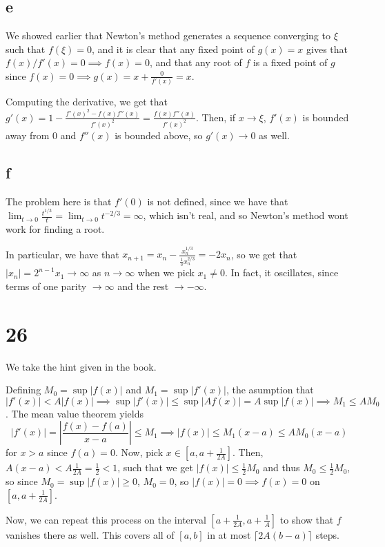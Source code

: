 \documentclass[12pt,letterpaper]{article}
\theoremstyle{definition}
\begin{document}
\subsection*{e}

We showed earlier that Newton's method generates a sequence converging to $\xi$ such that $f(\xi) = 0$, and it is clear that any fixed point of $g(x) = x$ gives that $f(x)/f'(x) = 0 \implies f(x) = 0$, and that any root of $f$ is a fixed point of $g$ since $f(x) = 0 \implies g(x) = x + \frac{0}{f'(x)} = x$.

Computing the derivative, we get that $g'(x) = 1 - \frac{f'(x)^{2} - f(x)f''(x)}{f'(x)^{2}} = \frac{f(x)f''(x)}{f'(x)^{2}}$. Then, if $x \rightarrow \xi$, $f'(x)$ is bounded away from 0 and $f''(x)$ is bounded above, so $g'(x) \rightarrow 0$ as well.

\subsection*{f}

The problem here is that $f'(0)$ is not defined, since we have that $\lim_{t \rightarrow 0}\frac{t^{1/3}}{t} = \lim_{t \rightarrow 0}t^{-2/3} = \infty$, which isn't real, and so Newton's method wont work for finding a root.

In particular, we have that $x_{n+1} = x_{n} - \frac{x_{n}^{1/3}}{\frac{1}{3}x_{n}^{2/3}} = -2x_{n}$, so we get that $|x_{n}| = 2^{n-1}x_{1} \rightarrow \infty$ as $n \rightarrow \infty$ when we pick $x_{1} \neq 0$. In fact, it oscillates, since terms of one parity $\rightarrow \infty$ and the rest $\rightarrow -\infty$.

\section*{26}

We take the hint given in the book.

Defining $M_{0} = \sup|f(x)|$ and $M_{1} = \sup|f'(x)|$, the asumption that $|f'(x)| < A|f(x)| \implies \sup|f'(x)| \leq \sup|Af(x)| = A\sup|f(x)| \implies M_{1} \leq AM_{0}$. The mean value theorem yields
\[
  |f'(x)| = \left|\frac{f(x) - f(a)}{x - a}\right| \leq M_{1} \implies |f(x)| \leq M_{1}(x - a) \leq AM_{0}(x - a)
\]
for $x > a$ since $f(a) = 0$. Now, pick $x \in [a, a + \frac{1}{2A}]$. Then, $A(x - a) < A\frac{1}{2A} = \frac{1}{2} < 1$, such that we get $|f(x)| \leq \frac{1}{2}M_{0}$ and thus $M_{0} \leq \frac{1}{2}M_{0}$, so since $M_{0} = \sup|f(x)| \geq 0$, $M_{0} = 0$, so $|f(x)| = 0 \implies f(x) = 0$ on $[a, a + \frac{1}{2A}]$.

Now, we can repeat this process on the interval $[a + \frac{1}{2A}, a + \frac{1}{A}]$ to show that $f$ vanishes there as well. This covers all of $[a,b]$ in at most $\lceil 2A(b - a) \rceil$ steps.
\end{document}

